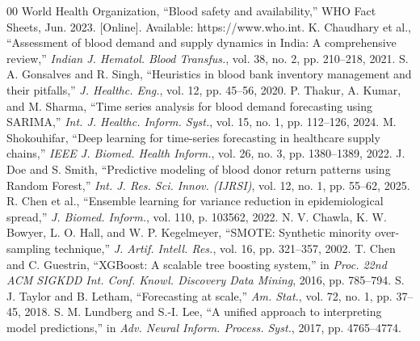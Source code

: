 \documentclass[conference]{IEEEtran}
\begin{document}
\begin{thebibliography}{00}
 World Health Organization, ``Blood safety and availability,'' WHO Fact Sheets, Jun. 2023. [Online]. Available: https://www.who.int.
 K. Chaudhary et al., ``Assessment of blood demand and supply dynamics in India: A comprehensive review,'' \emph{Indian J. Hematol. Blood Transfus.}, vol. 38, no. 2, pp. 210--218, 2021.
 S. A. Gonsalves and R. Singh, ``Heuristics in blood bank inventory management and their pitfalls,'' \emph{J. Healthc. Eng.}, vol. 12, pp. 45--56, 2020.
 P. Thakur, A. Kumar, and M. Sharma, ``Time series analysis for blood demand forecasting using SARIMA,'' \emph{Int. J. Healthc. Inform. Syst.}, vol. 15, no. 1, pp. 112--126, 2024.
 M. Shokouhifar, ``Deep learning for time-series forecasting in healthcare supply chains,'' \emph{IEEE J. Biomed. Health Inform.}, vol. 26, no. 3, pp. 1380--1389, 2022.
 J. Doe and S. Smith, ``Predictive modeling of blood donor return patterns using Random Forest,'' \emph{Int. J. Res. Sci. Innov. (IJRSI)}, vol. 12, no. 1, pp. 55--62, 2025.
 R. Chen et al., ``Ensemble learning for variance reduction in epidemiological spread,'' \emph{J. Biomed. Inform.}, vol. 110, p. 103562, 2022.
 N. V. Chawla, K. W. Bowyer, L. O. Hall, and W. P. Kegelmeyer, ``SMOTE: Synthetic minority over-sampling technique,'' \emph{J. Artif. Intell. Res.}, vol. 16, pp. 321--357, 2002. 
 T. Chen and C. Guestrin, ``XGBoost: A scalable tree boosting system,'' in \emph{Proc. 22nd ACM SIGKDD Int. Conf. Knowl. Discovery Data Mining}, 2016, pp. 785--794.
 S. J. Taylor and B. Letham, ``Forecasting at scale,'' \emph{Am. Stat.}, vol. 72, no. 1, pp. 37--45, 2018.
 S. M. Lundberg and S.-I. Lee, ``A unified approach to interpreting model predictions,'' in \emph{Adv. Neural Inform. Process. Syst.}, 2017, pp. 4765--4774.
\end{thebibliography}
\end{document}
